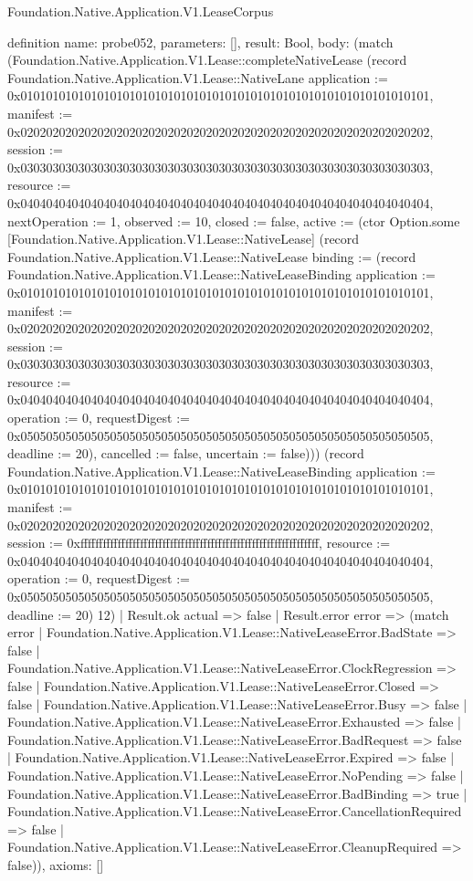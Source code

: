 \begin{lexlean}{Foundation.Native.Application.V1.LeaseCorpus}
\begin{semanticmodule}
definition{
  name: probe052,
  parameters: [],
  result: Bool,
  body: (match (Foundation.Native.Application.V1.Lease::completeNativeLease (record Foundation.Native.Application.V1.Lease::NativeLane {application := 0x0101010101010101010101010101010101010101010101010101010101010101, manifest := 0x0202020202020202020202020202020202020202020202020202020202020202, session := 0x0303030303030303030303030303030303030303030303030303030303030303, resource := 0x0404040404040404040404040404040404040404040404040404040404040404, nextOperation := 1, observed := 10, closed := false, active := (ctor Option.some [Foundation.Native.Application.V1.Lease::NativeLease] (record Foundation.Native.Application.V1.Lease::NativeLease {binding := (record Foundation.Native.Application.V1.Lease::NativeLeaseBinding {application := 0x0101010101010101010101010101010101010101010101010101010101010101, manifest := 0x0202020202020202020202020202020202020202020202020202020202020202, session := 0x0303030303030303030303030303030303030303030303030303030303030303, resource := 0x0404040404040404040404040404040404040404040404040404040404040404, operation := 0, requestDigest := 0x0505050505050505050505050505050505050505050505050505050505050505, deadline := 20}), cancelled := false, uncertain := false}))}) (record Foundation.Native.Application.V1.Lease::NativeLeaseBinding {application := 0x0101010101010101010101010101010101010101010101010101010101010101, manifest := 0x0202020202020202020202020202020202020202020202020202020202020202, session := 0xffffffffffffffffffffffffffffffffffffffffffffffffffffffffffffffff, resource := 0x0404040404040404040404040404040404040404040404040404040404040404, operation := 0, requestDigest := 0x0505050505050505050505050505050505050505050505050505050505050505, deadline := 20}) 12)
    | Result.ok actual => false
    | Result.error error => (match error
      | Foundation.Native.Application.V1.Lease::NativeLeaseError.BadState => false
      | Foundation.Native.Application.V1.Lease::NativeLeaseError.ClockRegression => false
      | Foundation.Native.Application.V1.Lease::NativeLeaseError.Closed => false
      | Foundation.Native.Application.V1.Lease::NativeLeaseError.Busy => false
      | Foundation.Native.Application.V1.Lease::NativeLeaseError.Exhausted => false
      | Foundation.Native.Application.V1.Lease::NativeLeaseError.BadRequest => false
      | Foundation.Native.Application.V1.Lease::NativeLeaseError.Expired => false
      | Foundation.Native.Application.V1.Lease::NativeLeaseError.NoPending => false
      | Foundation.Native.Application.V1.Lease::NativeLeaseError.BadBinding => true
      | Foundation.Native.Application.V1.Lease::NativeLeaseError.CancellationRequired => false
      | Foundation.Native.Application.V1.Lease::NativeLeaseError.CleanupRequired => false)),
  axioms: []
}


\end{semanticmodule}
\end{lexlean}
